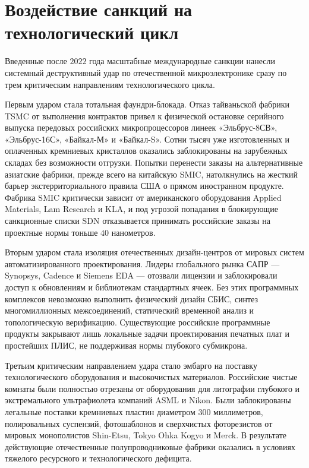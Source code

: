 \documentclass[12pt,a4paper]{article}
\begin{document}
\section{Воздействие санкций на технологический цикл}

Введенные после $2022$ года масштабные международные санкции нанесли 
системный деструктивный удар по отечественной микроэлектронике сразу 
по трем критическим направлениям технологического цикла.

Первым ударом стала тотальная фаундри-блокада. Отказ тайваньской 
фабрики TSMC от выполнения контрактов привел к физической остановке 
серийного выпуска передовых российских микропроцессоров линеек 
«Эльбрус-8СВ», «Эльбрус-16С», «Байкал-М» и «Байкал-S». Сотни тысяч 
уже изготовленных и оплаченных кремниевых кристаллов оказались 
заблокированы на зарубежных складах без возможности отгрузки. 
Попытки перенести заказы на альтернативные азиатские фабрики, 
прежде всего на китайскую SMIC, натолкнулись на жесткий барьер 
экстерриториального правила США о прямом иностранном продукте. 
Фабрика SMIC критически зависит от американского оборудования 
Applied Materials, Lam Research и KLA, и под угрозой попадания 
в блокирующие санкционные списки SDN отказывается принимать 
российские заказы на проектные нормы тоньше $40$ нанометров.

Вторым ударом стала изоляция отечественных дизайн-центров от мировых 
систем автоматизированного проектирования. Лидеры глобального рынка 
САПР --- Synopsys, Cadence и Siemens EDA --- отозвали лицензии и 
заблокировали доступ к обновлениям и библиотекам стандартных ячеек. 
Без этих программных комплексов невозможно выполнить физический 
дизайн СБИС, синтез многомиллионных межсоединений, статический 
временной анализ и топологическую верификацию. Существующие 
российские программные продукты закрывают лишь локальные задачи 
проектирования печатных плат и простейших ПЛИС, не поддерживая 
нормы глубокого субмикрона.

Третьим критическим направлением удара стало эмбарго на поставку 
технологического оборудования и высокочистых материалов. 
Российские чистые комнаты были полностью отрезаны от оборудования 
для литографии глубокого и экстремального ультрафиолета компаний 
ASML и Nikon. Были заблокированы легальные поставки кремниевых 
пластин диаметром $300$ миллиметров, полировальных суспензий, 
фотошаблонов и сверхчистых фоторезистов от мировых монополистов 
Shin-Etsu, Tokyo Ohka Kogyo и Merck. В результате действующие 
отечественные полупроводниковые фабрики оказались в условиях 
тяжелого ресурсного и технологического дефицита.
\end{document}
